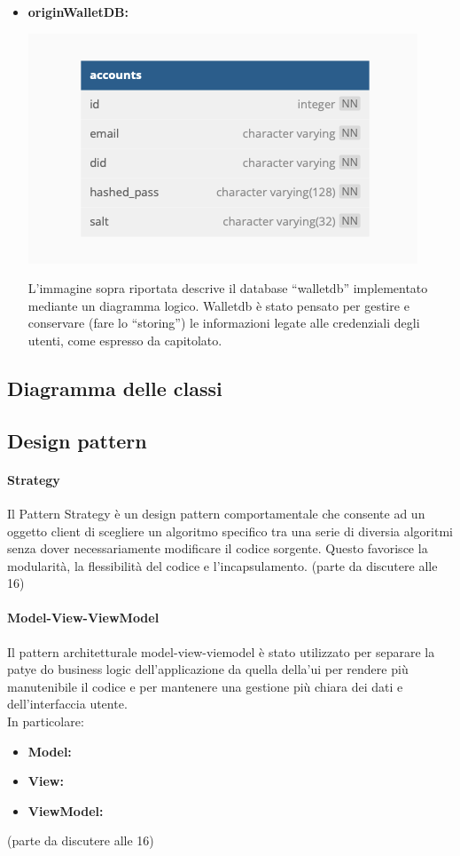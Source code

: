 \begin{itemize}
    \item \textbf{originWalletDB:}
     \begin{center}
        \includegraphics[scale = 0.6]{./res/img/walletdb.png}
      \end{center}
    
    L’immagine sopra riportata descrive il database “walletdb” implementato mediante un diagramma logico.
    Walletdb è stato pensato per gestire e conservare (fare lo “storing”) le informazioni legate alle credenziali degli utenti, come espresso da capitolato.\\
    
\end{itemize} 


\subsection{Diagramma delle classi}

\subsection{Design pattern}
\paragraph{Strategy}
Il Pattern Strategy è un design pattern comportamentale che consente ad un oggetto client di scegliere un algoritmo specifico tra una serie di diversia algoritmi senza dover necessariamente modificare il codice sorgente. Questo favorisce la modularità, la flessibilità del codice e l'incapsulamento. 
(parte da discutere alle 16)

\paragraph{Model-View-ViewModel}
Il pattern architetturale model-view-viemodel è stato utilizzato per separare la patye do business logic dell'applicazione da quella della'ui per rendere più manutenibile il codice e per mantenere una gestione più chiara dei dati e dell'interfaccia utente. \\
In particolare: 
\begin{itemize}
    \item \textbf{Model:}
    \item \textbf{View:}
    \item \textbf{ViewModel:}
\end{itemize}
(parte da discutere alle 16)
